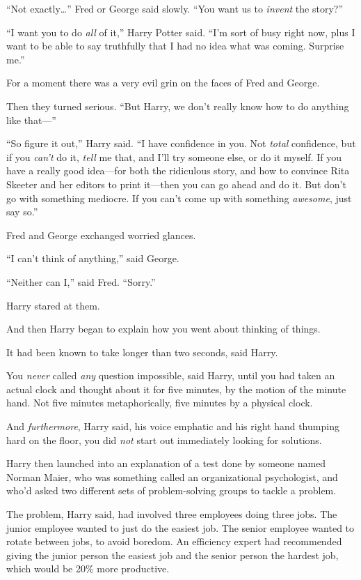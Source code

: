 “Not exactly…” Fred or George said slowly. “You want us to \emph{invent} the story?”

“I want you to do \emph{all} of it,” Harry Potter said. “I’m sort of busy right now, plus I want to be able to say truthfully that I had no idea what was coming. Surprise me.”

For a moment there was a very evil grin on the faces of Fred and George.

Then they turned serious. “But Harry, we don’t really know how to do anything like that—”

“So figure it out,” Harry said. “I have confidence in you. Not \emph{total} confidence, but if you \emph{can’t} do it, \emph{tell} me that, and I’ll try someone else, or do it myself. If you have a really good idea—for both the ridiculous story, and how to convince Rita Skeeter and her editors to print it—then you can go ahead and do it. But don’t go with something mediocre. If you can’t come up with something \emph{awesome}, just say so.”

Fred and George exchanged worried glances.

“I can’t think of anything,” said George.

“Neither can I,” said Fred. “Sorry.”

Harry stared at them.

And then Harry began to explain how you went about thinking of things.

It had been known to take longer than two seconds, said Harry.

You \emph{never} called \emph{any} question impossible, said Harry, until you had taken an actual clock and thought about it for five minutes, by the motion of the minute hand. Not five minutes metaphorically, five minutes by a physical clock.

And \emph{furthermore}, Harry said, his voice emphatic and his right hand thumping hard on the floor, you did \emph{not} start out immediately looking for solutions.

Harry then launched into an explanation of a test done by someone named Norman Maier, who was something called an organizational psychologist, and who’d asked two different sets of problem-solving groups to tackle a problem.

The problem, Harry said, had involved three employees doing three jobs. The junior employee wanted to just do the easiest job. The senior employee wanted to rotate between jobs, to avoid boredom. An efficiency expert had recommended giving the junior person the easiest job and the senior person the hardest job, which would be 20\% more productive.

